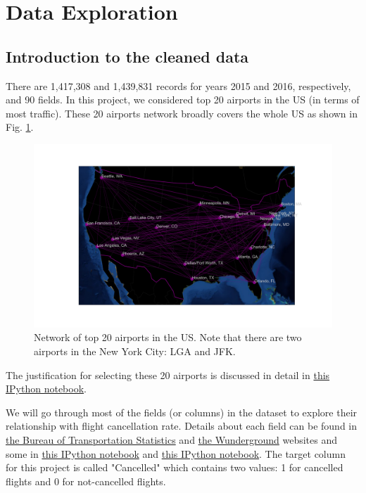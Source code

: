 \documentclass[12pt]{article}
\begin{document}
\section{Data Exploration}
\label{sec:eda}
\subsection{Introduction to the cleaned data}
\label{subsec:dataintro}
There are 1,417,308 and 1,439,831 records for years 2015 and 2016, respectively, and 90 fields. In this project, we considered top 20 airports in the US (in terms of most traffic). These 20 airports network broadly covers the whole US as shown in Fig. \ref{fig:map}. 
\begin{figure}[h!]
\begin{center}
\includegraphics[width=7in]{map.pdf}
\end{center}
\caption{\label{fig:map}
Network of top 20 airports in the US. Note that there are two airports in the New York City: LGA and JFK.}
\end{figure}
The justification for selecting these 20 airports is discussed in detail in \href{https://github.com/aajains/springboard-datascience-intensive/blob/master/capstone_project/DataAcquisitionMerging/data_acquisition_merging.ipynb}{this IPython notebook}. 


We will go through most of the fields (or columns) in the dataset to explore their relationship with flight cancellation rate. Details about each field can be found in \href{https://www.transtats.bts.gov/Fields.asp?Table_ID=236}{the Bureau of Transportation Statistics} and \href{https://www.wunderground.com/weather/api/d/docs?d=resources/phrase-glossary}{the Wunderground} websites and some in \href{https://github.com/aajains/springboard-datascience-intensive/blob/master/capstone_project/DataAcquisitionMerging/history_calc.ipynb}{this IPython notebook} and \href{https://github.com/aajains/springboard-datascience-intensive/blob/master/capstone_project/DataCleaning/data_cleaning.ipynb}{this IPython notebook}. The target column for this project is called  "Cancelled" which contains two values: 1 for cancelled flights and 0 for not-cancelled flights. 
\end{document}

